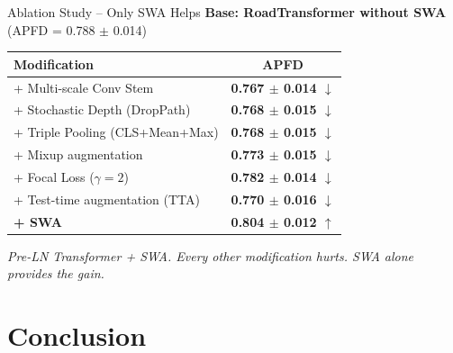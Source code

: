 \documentclass[aspectratio=169,10pt]{beamer}
\newcommand{\hlg}[1]{\textcolor{successgreen}{\textbf{#1}}}
\newcommand{\hlr}[1]{\textcolor{alertred}{\textbf{#1}}}
\begin{document}
\begin{frame}{Ablation Study -- Only SWA Helps}
  \textbf{Base: RoadTransformer without SWA} (APFD = 0.788 $\pm$ 0.014)
  \vspace{6pt}

  \begin{center}
  \begin{tabular}{lc}
    \toprule
    \textbf{Modification} & \textbf{APFD} \\
    \midrule
    + Multi-scale Conv Stem          & \hlr{0.767 $\pm$ 0.014 $\downarrow$} \\
    + Stochastic Depth (DropPath)    & \hlr{0.768 $\pm$ 0.015 $\downarrow$} \\
    + Triple Pooling (CLS+Mean+Max)  & \hlr{0.768 $\pm$ 0.015 $\downarrow$} \\
    + Mixup augmentation             & \hlr{0.773 $\pm$ 0.015 $\downarrow$} \\
    + Focal Loss ($\gamma{=}2$)      & \hlr{0.782 $\pm$ 0.014 $\downarrow$} \\
    + Test-time augmentation (TTA)   & \hlr{0.770 $\pm$ 0.016 $\downarrow$} \\
    \rowcolor{mLightBrown!20}
    \textbf{+ SWA}                   & \hlg{\textbf{0.804 $\pm$ 0.012 $\uparrow$}} \\
    \bottomrule
  \end{tabular}
  \end{center}

  \vspace{4pt}
  {\small\itshape
    Pre-LN Transformer + SWA. Every other modification hurts. SWA alone provides the gain.}
\end{frame}

\section{Conclusion}
\end{document}
